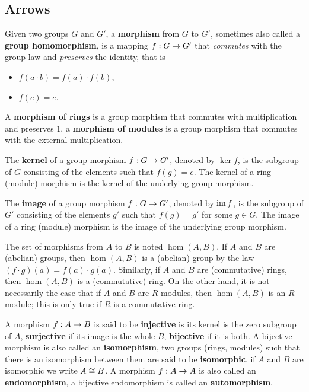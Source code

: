 \subsection{Arrows}
\label{sec:ring-fields:arrows}

Given two groups $G$ and $G'$, a
\textbf{morphism} from $G$ to $G'$,
sometimes also called a
\textbf{group homomorphism}, is a
mapping $f:G\rightarrow G'$ that \emph{commutes} with the group law and
\emph{preserves} the identity, that is
\begin{itemize}
\item $f(a\cdot b) = f(a) \cdot f(b)$,
\item $f(e) = e$.
\end{itemize}

A \textbf{morphism of rings} is a group
morphism that commutes with multiplication and preserves $1$, a
\textbf{morphism of modules} is a group
morphism that commutes with the external multiplication.

The \textbf{kernel} of a group morphism $f:G\rightarrow G'$,
denoted by $\ker f$, is the subgroup of $G$ consisting of the elements
such that $f(g)=e$. The kernel of a ring (module) morphism is the
kernel of the underlying group morphism.

The \textbf{image} of a group morphism $f:G\rightarrow G'$,
denoted by $\operatorname{im} f$, is the subgroup of $G'$ consisting of the elements
$g'$ such that $f(g)=g'$ for some $g\in G$. The image of a ring
(module) morphism is the image of the underlying group morphism.

The set of morphisms from $A$ to $B$ is noted $\hom(A,B)$. If $A$ and
$B$ are (abelian) groups, then $\hom (A,B)$ is a (abelian) group by
the law $(f\cdot g)(a) = f(a)\cdot g(a)$. Similarly, if $A$ and $B$
are (commutative) rings, then $\hom(A,B)$ is a (commutative) ring. On
the other hand, it is not necessarily the case that if $A$ and $B$ are
$R$-modules, then $\hom(A,B)$ is an $R$-module; this is only true if
$R$ is a commutative ring.

A morphism $f:A\rightarrow B$ is said to be
\textbf{injective} is its kernel is the zero
subgroup of $A$, \textbf{surjective} if its
image is the whole $B$, \textbf{bijective}
if it is both. A bijective morphism is also called an
\textbf{isomorphism}, two groups (rings, modules)
such that there is an isomorphism between them are said to be
\textbf{isomorphic}, if $A$ and $B$ are isomorphic
we write $A\cong B$. A morphism $f:A\rightarrow A$ is also called an
\textbf{endomorphism}, a bijective endomorphism is
called an \textbf{automorphism}.


